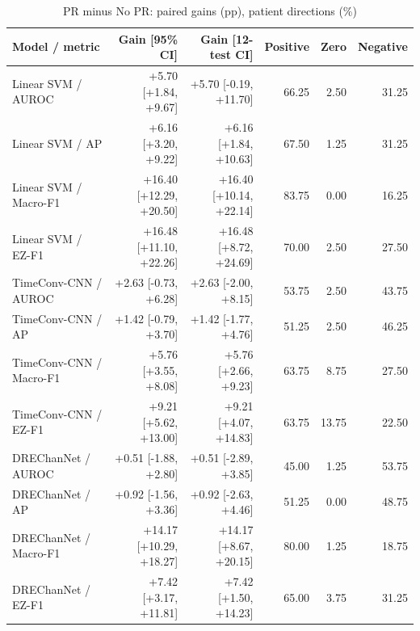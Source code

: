 \begin{table}[t]
\centering
\caption{PR minus No PR: paired gains (pp), patient directions (\%)}
\small
\begin{tabular}{lrrrrr}
\toprule
Model / metric & Gain [95\% CI] & Gain [12-test CI] & Positive & Zero & Negative \\
\midrule
Linear SVM / AUROC & +5.70 [+1.84, +9.67] & +5.70 [-0.19, +11.70] & 66.25 & 2.50 & 31.25 \\
Linear SVM / AP & +6.16 [+3.20, +9.22] & +6.16 [+1.84, +10.63] & 67.50 & 1.25 & 31.25 \\
Linear SVM / Macro-F1 & +16.40 [+12.29, +20.50] & +16.40 [+10.14, +22.14] & 83.75 & 0.00 & 16.25 \\
Linear SVM / EZ-F1 & +16.48 [+11.10, +22.26] & +16.48 [+8.72, +24.69] & 70.00 & 2.50 & 27.50 \\
TimeConv-CNN / AUROC & +2.63 [-0.73, +6.28] & +2.63 [-2.00, +8.15] & 53.75 & 2.50 & 43.75 \\
TimeConv-CNN / AP & +1.42 [-0.79, +3.70] & +1.42 [-1.77, +4.76] & 51.25 & 2.50 & 46.25 \\
TimeConv-CNN / Macro-F1 & +5.76 [+3.55, +8.08] & +5.76 [+2.66, +9.23] & 63.75 & 8.75 & 27.50 \\
TimeConv-CNN / EZ-F1 & +9.21 [+5.62, +13.00] & +9.21 [+4.07, +14.83] & 63.75 & 13.75 & 22.50 \\
DREChanNet / AUROC & +0.51 [-1.88, +2.80] & +0.51 [-2.89, +3.85] & 45.00 & 1.25 & 53.75 \\
DREChanNet / AP & +0.92 [-1.56, +3.36] & +0.92 [-2.63, +4.46] & 51.25 & 0.00 & 48.75 \\
DREChanNet / Macro-F1 & +14.17 [+10.29, +18.27] & +14.17 [+8.67, +20.15] & 80.00 & 1.25 & 18.75 \\
DREChanNet / EZ-F1 & +7.42 [+3.17, +11.81] & +7.42 [+1.50, +14.23] & 65.00 & 3.75 & 31.25 \\
\bottomrule
\end{tabular}
\end{table}
